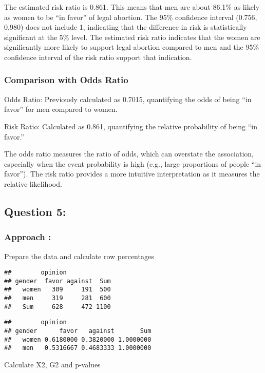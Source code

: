 \documentclass[
]{article}
\begin{document}
The estimated risk ratio is 0.861. This means that men are about 86.1\%
as likely as women to be ``in favor'' of legal abortion. The 95\%
confidence interval (0.756, 0.980) does not include 1, indicating that
the difference in risk is statistically significant at the 5\% level.
The estimated risk ratio indicates that the women are significantly more
likely to support legal abortion compared to men and the 95\% confidence
interval of the risk ratio support that indication.

\subsubsection{Comparison with Odds
Ratio}\label{comparison-with-odds-ratio}

Odds Ratio: Previously calculated as 0.7015, quantifying the odds of
being ``in favor'' for men compared to women.

Risk Ratio: Calculated as 0.861, quantifying the relative probability of
being ``in favor.''

The odds ratio measures the ratio of odds, which can overstate the
association, especially when the event probability is high (e.g., large
proportions of people ``in favor''). The risk ratio provides a more
intuitive interpretation as it measures the relative likelihood.

\subsection{Question 5:}\label{question-5}

\subsubsection{Approach :}\label{approach-1}

Prepare the data and calculate row percentages

\begin{verbatim}
##        opinion
## gender  favor against  Sum
##   women   309     191  500
##   men     319     281  600
##   Sum     628     472 1100
\end{verbatim}

\begin{verbatim}
##        opinion
## gender      favor   against       Sum
##   women 0.6180000 0.3820000 1.0000000
##   men   0.5316667 0.4683333 1.0000000
\end{verbatim}

Calculate X2, G2 and p-values
\end{document}
